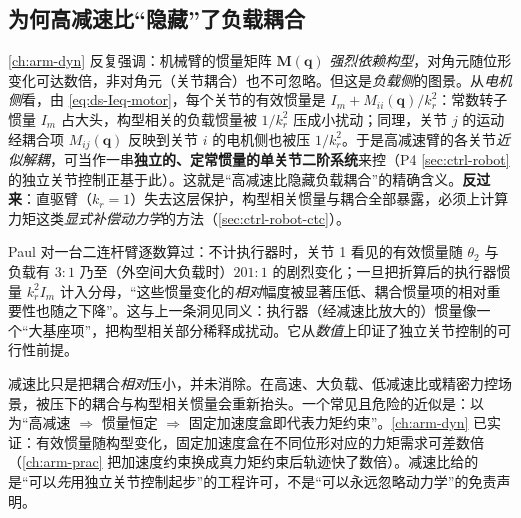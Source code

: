 \subsection{为何高减速比“隐藏”了负载耦合}
\label{sec:ds-hidecoupling}

\begin{insight}[$1/k_r^2$ 把构型相关惯量与关节耦合都压平]
\label{ins:ds-hide-coupling}
\cref{ch:arm-dyn} 反复强调：机械臂的惯量矩阵 $\mathbf{M}(\mathbf{q})$ \emph{强烈依赖构型}，对角元随位形变化可达数倍，非对角元（关节耦合）也不可忽略。但这是\emph{负载侧}的图景。从\emph{电机侧}看，由 \cref{eq:ds-Ieq-motor}，每个关节的有效惯量是 $I_m+M_{ii}(\mathbf{q})/k_r^2$：常数转子惯量 $I_m$ 占大头，构型相关的负载惯量被 $1/k_r^2$ 压成小扰动；同理，关节 $j$ 的运动经耦合项 $M_{ij}(\mathbf{q})$ 反映到关节 $i$ 的电机侧也被压 $1/k_r^2$。于是高减速臂的各关节\emph{近似解耦}，可当作一串\textbf{独立的、定常惯量的单关节二阶系统}来控（P4 \cref{sec:ctrl-robot} 的独立关节控制正基于此）。这就是“高减速比隐藏负载耦合”的精确含义。\textbf{反过来}：直驱臂（$k_r=1$）失去这层保护，构型相关惯量与耦合全部暴露，必须上计算力矩这类\emph{显式补偿动力学}的方法（\cref{sec:ctrl-robot-ctc}）。
\end{insight}

\begin{insight}
\label{ins:ds-paul-evidence}
Paul 对一台二连杆臂逐数算过\cite{paul1981robot}：不计执行器时，关节 1 看见的有效惯量随 $\theta_2$ 与负载有 $3{:}1$ 乃至（外空间大负载时）$201{:}1$ 的剧烈变化；一旦把折算后的执行器惯量 $k_r^2 I_m$ 计入分母，“这些惯量变化的\emph{相对}幅度被显著压低、耦合惯量项的相对重要性也随之下降”。这与上一条洞见同义：执行器（经减速比放大的）惯量像一个“大基座项”，把构型相关部分稀释成扰动。它从\emph{数值}上印证了独立关节控制的可行性前提。
\end{insight}

\begin{pitfall}[“隐藏”不是“消失”——别把加速度盒当力矩约束]
减速比只是把耦合\emph{相对}压小，并未消除。在高速、大负载、低减速比或精密力控场景，被压下的耦合与构型相关惯量会重新抬头。一个常见且危险的近似是：以为“高减速 $\Rightarrow$ 惯量恒定 $\Rightarrow$ 固定加速度盒即代表力矩约束”。\cref{ch:arm-dyn} 已实证：有效惯量随构型变化，固定加速度盒在不同位形对应的力矩需求可差数倍（\cref{ch:arm-prac} 把加速度约束换成真力矩约束后轨迹快了数倍）。减速比给的是“可以\emph{先}用独立关节控制起步”的工程许可，不是“可以永远忽略动力学”的免责声明。
\end{pitfall}

